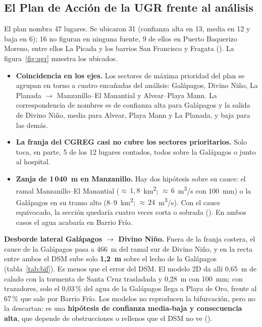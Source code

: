 \documentclass{sosg-informe}
\newcommand{\kmc}{km\textsuperscript{2}}
\newcommand{\mcs}{m\textsuperscript{3}/s}
\begin{document}
\subsection{El Plan de Acción de la UGR frente al análisis}
El plan \citep{ugr2026} nombra 47 lugares. Se ubicaron 31 (confianza alta en 13, media en 12 y baja en 6); 16 no figuran en ninguna fuente, 9 de ellos en Puerto Baquerizo Moreno, entre ellos La Picada y los barrios San Francisco y Fragata (). La figura~\ref{fig:ugr} muestra los ubicados.
\begin{itemize}
  \item \textbf{Coincidencia en los ejes.} Los sectores de máxima prioridad del plan se agrupan en torno a cuatro encañadas del análisis: Galápagos, Divino Niño, La Planada $\to$ Manzanillo--El Manantial y Alvear--Playa Mann. La correspondencia de nombres es de confianza alta para Galápagos y la salida de Divino Niño, media para Alvear, Playa Mann y La Planada, y baja para las demás.
  \item \textbf{La franja del CGREG casi no cubre los sectores prioritarios.} Solo toca, en parte, 5 de los 12 lugares contados, todos sobre la Galápagos o junto al hospital.
  \item \textbf{Zanja de 1\,040~m en Manzanillo.} Hay dos hipótesis sobre su cauce: el ramal Manzanillo--El Manantial (${\approx}\,1{,}8$~\kmc; ${\approx}\,6$~\mcs{} con 100~mm) o la Galápagos en su tramo alto (8--9~\kmc; ${\approx}\,24$~\mcs). Con el cauce equivocado, la sección quedaría cuatro veces corta o sobrada (). En ambos casos el agua acabaría en Barrio Frío.
\end{itemize}

\textbf{Desborde lateral Galápagos $\to$ Divino Niño.} Fuera de la franja costera, el cauce de la Galápagos pasa a 466~m del ramal sur de Divino Niño, y en la recta entre ambos el DSM sube solo \textbf{1,2~m} sobre el lecho de la Galápagos (tabla~\ref{tab:bif}). Es menos que el error del DSM. El modelo 2D da allí 0,65~m de calado con la tormenta de Santa Cruz trasladada y 0,28~m con 100~mm; con trazadores, solo el 0,03\,\% del agua de la Galápagos llega a Playa de Oro, frente al 67\,\% que sale por Barrio Frío. Los modelos no reproducen la bifurcación, pero no la descartan: es una \textbf{hipótesis de confianza media-baja y consecuencia alta}, que depende de obstrucciones o rellenos que el DSM no ve ().
\end{document}
